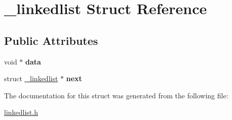 \hypertarget{struct__linkedlist}{}\section{\+\_\+linkedlist Struct Reference}
\label{struct__linkedlist}
\subsection*{Public Attributes}
\begin{DoxyCompactItemize}
\item 
\hypertarget{struct__linkedlist_a8c7c721466e01524c9af19e30f222480}{}void $\ast$ {\bfseries data}\label{struct__linkedlist_a8c7c721466e01524c9af19e30f222480}

\item 
\hypertarget{struct__linkedlist_a6cd0c7f201d0923b75d1dbc6858da5d5}{}struct \hyperlink{struct__linkedlist}{\+\_\+linkedlist} $\ast$ {\bfseries next}\label{struct__linkedlist_a6cd0c7f201d0923b75d1dbc6858da5d5}

\end{DoxyCompactItemize}


The documentation for this struct was generated from the following file\+:\begin{DoxyCompactItemize}
\item 
\hyperlink{linkedlist_8h}{linkedlist.\+h}\end{DoxyCompactItemize}

